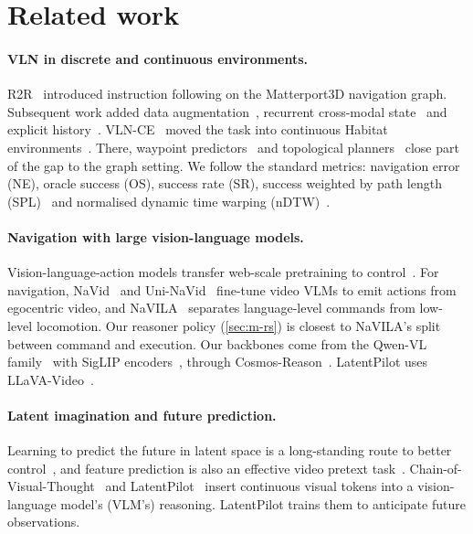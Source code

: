 \documentclass[11pt]{article}
\begin{document}
\section{Related work}

\paragraph{VLN in discrete and continuous environments.}
R2R~\citep{anderson2018r2r} introduced instruction following on the Matterport3D navigation graph. Subsequent work added
data augmentation~\citep{fried2018speaker}, recurrent cross-modal state~\citep{hong2021vlnbert} and explicit
history~\citep{chen2021hamt}. VLN-CE~\citep{krantz2020vlnce,vlnce2020code} moved the task into continuous Habitat
environments~\citep{savva2019habitat,szot2021habitat2}. There, waypoint predictors~\citep{hong2022bridging} and
topological planners~\citep{an2023etpnav} close part of the gap to the graph setting. We follow the standard metrics:
navigation error (NE), oracle success (OS), success rate (SR), success weighted by path length
(SPL)~\citep{anderson2018evaluation} and normalised dynamic time warping (nDTW)~\citep{ilharco2019ndtw}.

\paragraph{Navigation with large vision-language models.}
Vision-language-action models transfer web-scale pretraining to control~\citep{brohan2023rt2,kim2024openvla}.
For navigation, NaVid~\citep{zhang2024navid} and Uni-NaVid~\citep{zhang2024uninavid} fine-tune video VLMs to emit
actions from egocentric video, and NaVILA~\citep{cheng2024navila} separates language-level commands from low-level
locomotion. Our reasoner policy (\cref{sec:m-rs}) is closest to NaVILA's split between command and execution. Our
backbones come from the Qwen-VL family~\citep{wang2024qwen2vl,bai2025qwen25vl} with SigLIP
encoders~\citep{zhai2023siglip,tschannen2025siglip2}, through Cosmos-Reason~\citep{nvidia2025cosmosreason1,
nvidia2025cosmosreason2}. LatentPilot uses LLaVA-Video~\citep{zhang2024llavavideo}.

\paragraph{Latent imagination and future prediction.}
Learning to predict the future in latent space is a long-standing route to better
control~\citep{ha2018worldmodels,hafner2023dreamerv3}, and feature prediction is also an effective video
pretext task~\citep{bardes2024vjepa}. Chain-of-Visual-Thought~\citep{covt} and LatentPilot~\citep{latentpilot} insert
continuous visual tokens into a vision-language model's (VLM's) reasoning. LatentPilot trains them to anticipate future observations.
\end{document}
